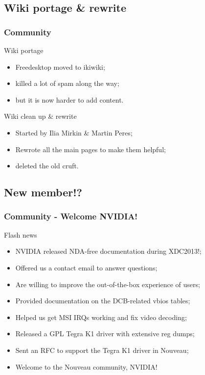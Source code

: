 \documentclass[11pt,english,compress]{beamer}
\begin{document}
\subsection{Wiki portage \& rewrite}
\begin{frame}
	\frametitle{Community}

	\begin{block}{Wiki portage}
		\begin{itemize}
			\item Freedesktop moved to ikiwiki;
			\item killed a lot of spam along the way;
			\item but it is now harder to add content.
		\end{itemize}
	\end{block}

	\begin{block}{Wiki clean up \& rewrite}
		\begin{itemize}
			\item Started by Ilia Mirkin \& Martin Peres;
			\item Rewrote all the main pages to make them helpful;
			\item deleted the old cruft.
		\end{itemize}
	\end{block}
\end{frame}

\subsection{New member!?}
\begin{frame}
	\frametitle{Community - Welcome NVIDIA!}

	\begin{block}{Flash news}
		\begin{itemize}
			\item NVIDIA released NDA-free documentation during
XDC2013!;
			\item Offered us a contact email to answer questions;
			\item Are willing to improve the out-of-the-box
experience of users;
			\item Provided documentation on the DCB-related vbios
tables;
			\item Helped us get MSI IRQs working and fix video
decoding;
			\item Released a GPL Tegra K1 driver with extensive reg
dumps;
			\item Sent an RFC to support the Tegra K1 driver in Nouveau;
			\item Welcome to the Nouveau community, NVIDIA!
		\end{itemize}
	\end{block}
\end{frame}

\end{document}
